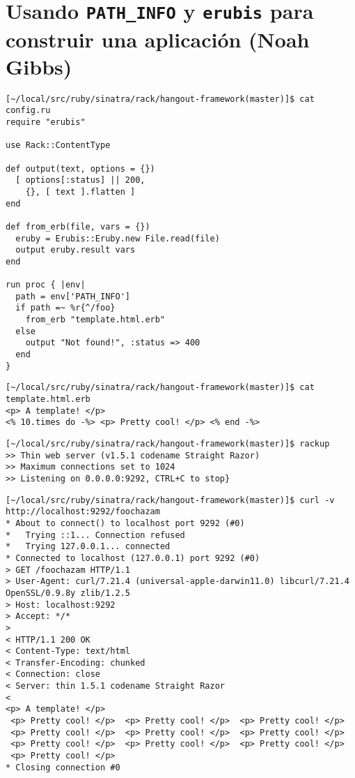 \section{Usando {\tt PATH\_INFO} y {\tt erubis} para construir una aplicación (Noah Gibbs)}


\begin{verbatim}
[~/local/src/ruby/sinatra/rack/hangout-framework(master)]$ cat config.ru 
require "erubis"

use Rack::ContentType

def output(text, options = {})
  [ options[:status] || 200,
    {}, [ text ].flatten ]
end

def from_erb(file, vars = {})
  eruby = Erubis::Eruby.new File.read(file)
  output eruby.result vars
end

run proc { |env|
  path = env['PATH_INFO']
  if path =~ %r{^/foo}
    from_erb "template.html.erb"
  else
    output "Not found!", :status => 400
  end
}
\end{verbatim}


\begin{verbatim}
[~/local/src/ruby/sinatra/rack/hangout-framework(master)]$ cat template.html.erb 
<p> A template! </p>
<% 10.times do -%> <p> Pretty cool! </p> <% end -%>
\end{verbatim}

\begin{verbatim}
[~/local/src/ruby/sinatra/rack/hangout-framework(master)]$ rackup
>> Thin web server (v1.5.1 codename Straight Razor)
>> Maximum connections set to 1024
>> Listening on 0.0.0.0:9292, CTRL+C to stop}
\end{verbatim}

\begin{verbatim}
[~/local/src/ruby/sinatra/rack/hangout-framework(master)]$ curl -v http://localhost:9292/foochazam
* About to connect() to localhost port 9292 (#0)
*   Trying ::1... Connection refused
*   Trying 127.0.0.1... connected
* Connected to localhost (127.0.0.1) port 9292 (#0)
> GET /foochazam HTTP/1.1
> User-Agent: curl/7.21.4 (universal-apple-darwin11.0) libcurl/7.21.4 OpenSSL/0.9.8y zlib/1.2.5
> Host: localhost:9292
> Accept: */*
> 
< HTTP/1.1 200 OK
< Content-Type: text/html
< Transfer-Encoding: chunked
< Connection: close
< Server: thin 1.5.1 codename Straight Razor
< 
<p> A template! </p>
 <p> Pretty cool! </p>  <p> Pretty cool! </p>  <p> Pretty cool! </p>  
 <p> Pretty cool! </p>  <p> Pretty cool! </p>  <p> Pretty cool! </p>  
 <p> Pretty cool! </p>  <p> Pretty cool! </p>  <p> Pretty cool! </p>  
 <p> Pretty cool! </p> 
* Closing connection #0
\end{verbatim}


